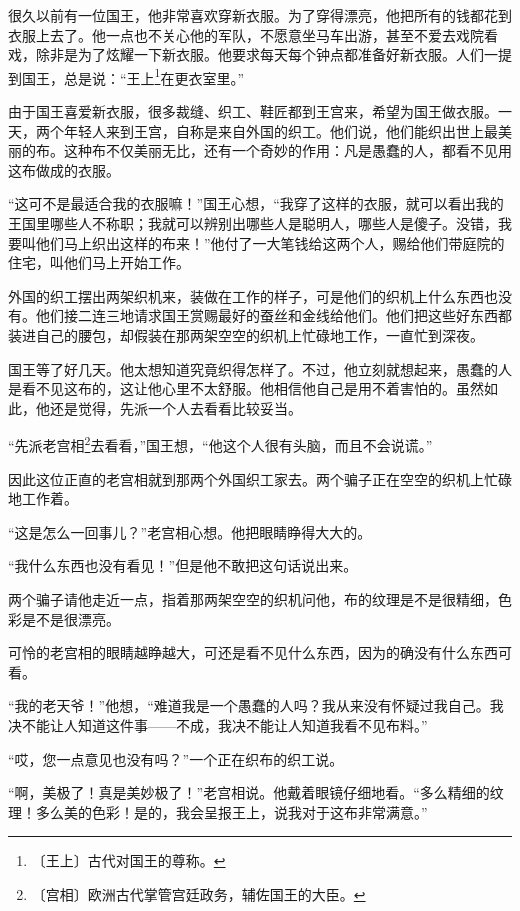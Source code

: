 \documentclass[12pt,UTF-8,openany]{ctexbook}
\begin{document}
\begin{large}
    
    很久以前有一位国王，他非常喜欢穿新衣服。为了穿得漂亮，他把所有的钱都花到衣服上去了。他一点也不关心他的军队，不愿意坐马车出游，甚至不爱去戏院看戏，除非是为了炫耀一下新衣服。他要求每天每个钟点都准备好新衣服。人们一提到国王，总是说：“王上\footnote{〔王上〕古代对国王的尊称。}在更衣室里。”
    
    由于国王喜爱新衣服，很多裁缝、织工、鞋匠都到王宫来，希望为国王做衣服。一天，两个年轻人来到王宫，自称是来自外国的织工。他们说，他们能织出世上最美丽的布。这种布不仅美丽无比，还有一个奇妙的作用：凡是愚蠢的人，都看不见用这布做成的衣服。
    
    “这可不是最适合我的衣服嘛！”国王心想，“我穿了这样的衣服，就可以看出我的王国里哪些人不称职；我就可以辨别出哪些人是聪明人，哪些人是傻子。没错，我要叫他们马上织出这样的布来！”他付了一大笔钱给这两个人，赐给他们带庭院的住宅，叫他们马上开始工作。
    
    外国的织工摆出两架织机来，装做在工作的样子，可是他们的织机上什么东西也没有。他们接二连三地请求国王赏赐最好的蚕丝和金线给他们。他们把这些好东西都装进自己的腰包，却假装在那两架空空的织机上忙碌地工作，一直忙到深夜。
    
    国王等了好几天。他太想知道究竟织得怎样了。不过，他立刻就想起来，愚蠢的人是看不见这布的，这让他心里不太舒服。他相信他自己是用不着害怕的。虽然如此，他还是觉得，先派一个人去看看比较妥当。
    
    “先派老宫相\footnote{〔宫相〕欧洲古代掌管宫廷政务，辅佐国王的大臣。}去看看，”国王想，“他这个人很有头脑，而且不会说谎。”
    
    因此这位正直的老宫相就到那两个外国织工家去。两个骗子正在空空的织机上忙碌地工作着。
    
    “这是怎么一回事儿？”老宫相心想。他把眼睛睁得大大的。
    
    “我什么东西也没有看见！”但是他不敢把这句话说出来。
    
    两个骗子请他走近一点，指着那两架空空的织机问他，布的纹理是不是很精细，色彩是不是很漂亮。
    
    可怜的老宫相的眼睛越睁越大，可还是看不见什么东西，因为的确没有什么东西可看。
    
    “我的老天爷！”他想，“难道我是一个愚蠢的人吗？我从来没有怀疑过我自己。我决不能让人知道这件事——不成，我决不能让人知道我看不见布料。”
    
    “哎，您一点意见也没有吗？”一个正在织布的织工说。
    
    “啊，美极了！真是美妙极了！”老宫相说。他戴着眼镜仔细地看。“多么精细的纹理！多么美的色彩！是的，我会呈报王上，说我对于这布非常满意。”
    

\end{large}
\end{document}
